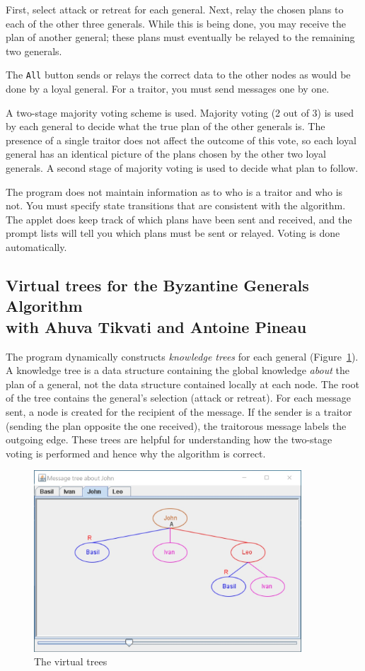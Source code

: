 \documentclass[11pt]{article}
\newcommand{\p}[1]{\texttt{#1}}
\begin{document}
First, select attack or retreat for each general. Next, relay the
chosen plans to each of the other three generals. While this is
being done, you may receive the plan of another general; these
plans must eventually be relayed to the remaining two generals.

The \p{All} button sends or relays the correct data
to the other nodes as would be done by a loyal general. For a
traitor, you must send messages one by one.

A two-stage majority voting scheme is used. Majority voting (2
out of 3) is used by each general to decide what the true plan
of the other generals is. The presence of a single traitor does
not affect the outcome of this vote, so each loyal general has
an identical picture of the plans chosen by the other two loyal
generals. A second stage of majority voting is used to decide
what plan to follow.

The program does not maintain information as to who is a traitor
and who is not. You must specify state transitions that are
consistent with the algorithm. The applet does keep track of
which plans have been sent and received, and the prompt lists
will tell you which plans must be sent or relayed. Voting is
done automatically.

\subsection{Virtual trees for the Byzantine Generals Algorithm\\
with Ahuva Tikvati and Antoine Pineau}

The program dynamically constructs \emph{knowledge trees} for each general (Figure~\ref{fig3}).
A knowledge tree is a data structure
containing the global knowledge \emph{about} the plan of a
general, not the data structure contained locally at each node.
The root of the tree contains the general's selection (attack or
retreat). For each message sent, a node is created for the
recipient of the message. If the sender is a traitor (sending
the plan opposite the one received), the traitorous message
labels the outgoing edge. These trees are helpful for
understanding how the two-stage voting is performed and hence
why the algorithm is correct.

\begin{figure}[htb]
\begin{center}
\includegraphics[width=10cm,keepaspectratio=true]{tree.jpg}
\end{center}
\caption{The virtual trees}\label{fig3}
\end{figure}
\end{document}
